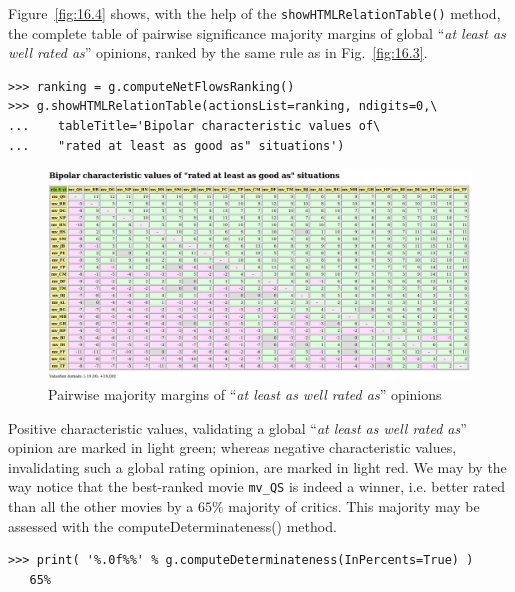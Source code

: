 Figure~\vref{fig:16.4} shows, with the help of the \texttt{showHTMLRelationTable()} method, the complete table of pairwise significance majority margins of global ``\emph{at least as well rated as}'' opinions, ranked by the same \NetFlows rule as in Fig.~\vref{fig:16.3}.
\begin{lstlisting}[caption={Showing the outranking characteristics, ranked by the \NetFlows rule in a browser view},label=list:16.3]      
>>> ranking = g.computeNetFlowsRanking()
>>> g.showHTMLRelationTable(actionsList=ranking, ndigits=0,\
...    tableTitle='Bipolar characteristic values of\
...    "rated at least as good as" situations')
\end{lstlisting}
\begin{figure}[h]
\includegraphics[width=11.5cm]{Figures/graffiti07_3.png}
\caption{Pairwise majority margins of ``\emph{at least as well rated as}'' opinions}
\label{fig:16.4}       %
\end{figure}

Positive characteristic values, validating a global ``\emph{at least as well rated as}'' opinion are marked in light green; whereas negative characteristic values, invalidating such a global rating opinion, are marked in light red. We may by the way notice that the best-ranked movie \texttt{mv\_QS} is indeed a \Condorcet winner, i.e. better rated than all the other movies by a $65\%$ majority of critics. This majority may be assessed with the computeDeterminateness() method.
\begin{lstlisting}      
>>> print( '%.0f%%' % g.computeDeterminateness(InPercents=True) )
   65%
\end{lstlisting}

